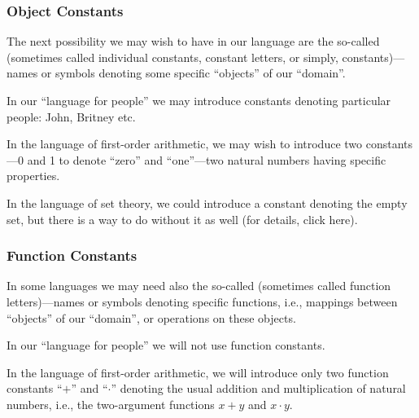 \subsubsection*{Object Constants}

The next possibility we may wish to have in our language are the so-called  (sometimes called individual constants, constant letters, or simply, constants)---names or symbols denoting some specific ``objects'' of our ``domain''.

\begin{ex}[]
In our ``language for people'' we may introduce constants denoting particular people: John, Britney etc.
\end{ex}

\begin{ex}[]
In the language of first-order arithmetic, we may wish to introduce two constants---0 and 1 to denote ``zero'' and ``one''---two natural numbers having specific properties.
\end{ex}

\begin{ex}[]
In the language of set theory, we could introduce a constant denoting the empty set, but there is a way to do without it as well (for details, click here).
\end{ex}

\subsubsection*{Function Constants}

In some languages we may need also the so-called  (sometimes called function letters)---names or symbols denoting specific functions, i.e., mappings between ``objects'' of our ``domain'', or operations on these objects.

\begin{ex}[]
In our ``language for people'' we will not use function constants.
\end{ex}

\begin{ex}[]
In the language of first-order arithmetic, we will introduce only two function constants ``\(+\)'' and ``\(\cdot\)'' denoting the usual addition and multiplication of natural numbers, i.e., the two-argument functions \(x+y\) and \(x\cdot y\).
\end{ex}


